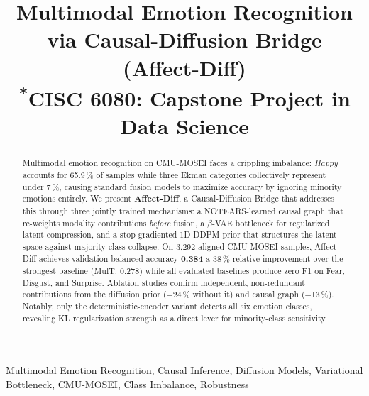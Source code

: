 \documentclass[conference]{IEEEtran}
\begin{document}
\title{Multimodal Emotion Recognition via Causal-Diffusion Bridge (Affect-Diff)\\
{\footnotesize \textsuperscript{*}CISC 6080: Capstone Project in Data Science}}

\author{
}

\maketitle

\begin{abstract}
Multimodal emotion recognition on CMU-MOSEI faces a crippling imbalance:
\emph{Happy} accounts for 65.9\,\% of samples while three Ekman categories
collectively represent under 7\,\%, causing standard fusion models to maximize
accuracy by ignoring minority emotions entirely.
We present \textbf{Affect-Diff}, a Causal-Diffusion Bridge that addresses this
through three jointly trained mechanisms: a NOTEARS-learned causal graph that
re-weights modality contributions \emph{before} fusion, a $\beta$-VAE
bottleneck for regularized latent compression, and a stop-gradiented 1D DDPM
prior that structures the latent space against majority-class collapse.
On 3{,}292 aligned CMU-MOSEI samples, Affect-Diff achieves validation balanced
accuracy \textbf{0.384} a 38\,\% relative improvement over the strongest
baseline (MulT: 0.278) while all evaluated baselines produce zero F1 on
Fear, Disgust, and Surprise.
Ablation studies confirm independent, non-redundant contributions from the
diffusion prior ($-$24\,\% without it) and causal graph ($-$13\,\%).
Notably, only the deterministic-encoder variant detects all six emotion classes,
revealing KL regularization strength as a direct lever for minority-class
sensitivity.
\end{abstract}

\begin{IEEEkeywords}
Multimodal Emotion Recognition, Causal Inference, Diffusion Models,
Variational Bottleneck, CMU-MOSEI, Class Imbalance, Robustness
\end{IEEEkeywords}

\end{document}
